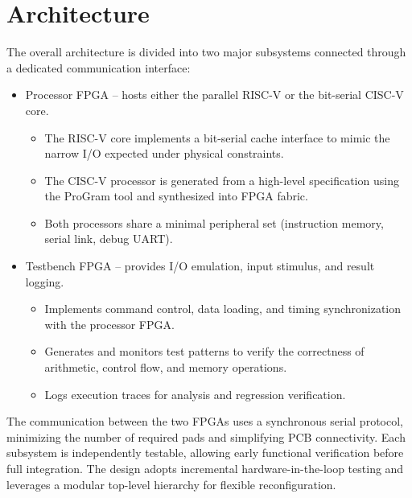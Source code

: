 \documentclass[10pt,twocolumn]{article}
\begin{document}
\section{Architecture}
The overall architecture is divided into two major subsystems connected through a dedicated communication interface:
\begin{itemize}
\item Processor FPGA – hosts either the parallel RISC-V or the bit-serial CISC-V core.
\begin{itemize}
    \item The RISC-V core implements a bit-serial cache interface to mimic the narrow I/O expected under physical constraints.
    \item The CISC-V processor is generated from a high-level specification using the ProGram tool and synthesized into FPGA fabric.
    \item Both processors share a minimal peripheral set (instruction memory, serial link, debug UART).
\end{itemize}
\item Testbench FPGA – provides I/O emulation, input stimulus, and result logging.
\begin{itemize}
    \item Implements command control, data loading, and timing synchronization with the processor FPGA.
    \item Generates and monitors test patterns to verify the correctness of arithmetic, control flow, and memory operations.
    \item Logs execution traces for analysis and regression verification.
\end{itemize}
\end{itemize}
The communication between the two FPGAs uses a synchronous serial protocol, minimizing the number of required pads and simplifying PCB connectivity. Each subsystem is independently testable, allowing early functional verification before full integration. The design adopts incremental hardware-in-the-loop testing and leverages a modular top-level hierarchy for flexible reconfiguration.
\end{document}
